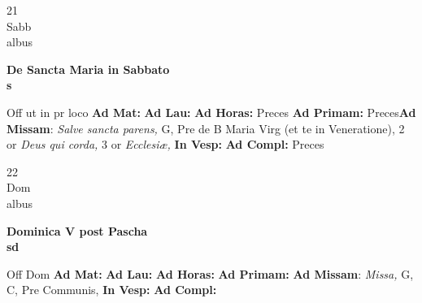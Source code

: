 \documentclass[10pt, openany]{book}
\begin{document}
    \begin{center}
        \begin{minipage}{3.5in}
            \vspace{2em}
            \begin{minipage}{0.5in}
                {\Huge 21} \\
                {\normalsize Sabb} \\
                {\normalsize albus}
            \end{minipage}
            \begin{minipage}{3.0in}
                \textbf{ \large De Sancta Maria in Sabbato \\
                \textnormal{\normalsize s}} \\ 
            \end{minipage}
            \begin{justify}Off ut in pr loco
                \textbf{Ad Mat: }
                \textbf{Ad Lau: }
                \textbf{Ad Horas: }Preces
                \textbf{Ad Primam: }Preces\textbf{Ad Missam}: \textit{Salve sancta parens,} G, Pre de B Maria Virg (et te in Veneratione), 2 or \textit{Deus qui corda,} 3 or \textit{Ecclesiæ,}  
                \textbf{In Vesp: }
                \textbf{Ad Compl: }Preces
            \end{justify}
        \end{minipage}
    \end{center}

    \begin{center}
        \begin{minipage}{3.5in}
            \vspace{2em}
            \begin{minipage}{0.5in}
                {\Huge 22} \\
                {\normalsize Dom} \\
                {\normalsize albus}
            \end{minipage}
            \begin{minipage}{3.0in}
                \textbf{ \large Dominica V post Pascha \\
                \textnormal{\normalsize sd}} \\ 
            \end{minipage}
            \begin{justify}Off Dom
                \textbf{Ad Mat: }
                \textbf{Ad Lau: }
                \textbf{Ad Horas: }
                \textbf{Ad Primam: }\textbf{Ad Missam}: \textit{Missa,} G, C, Pre Communis,  
                \textbf{In Vesp: }
                \textbf{Ad Compl: }
            \end{justify}
        \end{minipage}
    \end{center}
\end{document}
